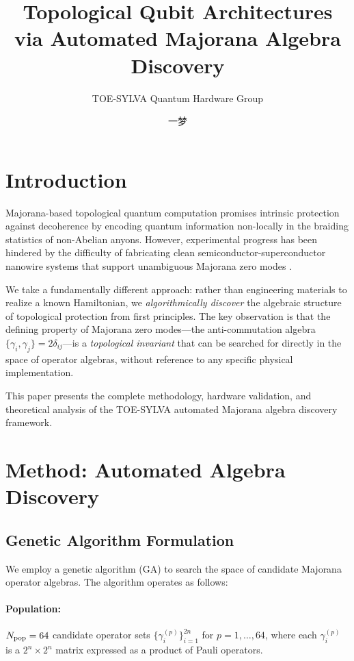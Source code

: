 \documentclass[12pt,reprint,amsfont,amssymb]{revtex4-2}
\title{Topological Qubit Architectures via Automated Majorana Algebra Discovery}
\author{TOE-SYLVA Quantum Hardware Group}
\author{一梦}
\affiliation{TOE-SYLVA Research Laboratory}
\affiliation{Origin Quantum Computing}
\affiliation{Chinese Academy of Sciences}
\begin{document}
\maketitle

\section{Introduction}
\label{sec:intro}

Majorana-based topological quantum computation \cite{Kitaev2001} promises intrinsic protection against decoherence by encoding quantum information non-locally in the braiding statistics of non-Abelian anyons. However, experimental progress has been hindered by the difficulty of fabricating clean semiconductor-superconductor nanowire systems that support unambiguous Majorana zero modes \cite{Mourik2012,Albrecht2016}.

We take a fundamentally different approach: rather than engineering materials to realize a known Hamiltonian, we \emph{algorithmically discover} the algebraic structure of topological protection from first principles. The key observation is that the defining property of Majorana zero modes---the anti-commutation algebra $\{\gamma_i, \gamma_j\} = 2\delta_{ij}$---is a \emph{topological invariant} that can be searched for directly in the space of operator algebras, without reference to any specific physical implementation.

This paper presents the complete methodology, hardware validation, and theoretical analysis of the TOE-SYLVA automated Majorana algebra discovery framework.

\section{Method: Automated Algebra Discovery}
\label{sec:method}

\subsection{Genetic Algorithm Formulation}

We employ a genetic algorithm (GA) to search the space of candidate Majorana operator algebras. The algorithm operates as follows:

\paragraph{Population:} $N_{\rm pop} = 64$ candidate operator sets $\{\gamma_i^{(p)}\}_{i=1}^{2n}$ for $p = 1, \ldots, 64$, where each $\gamma_i^{(p)}$ is a $2^n \times 2^n$ matrix expressed as a product of Pauli operators.
\end{document}
